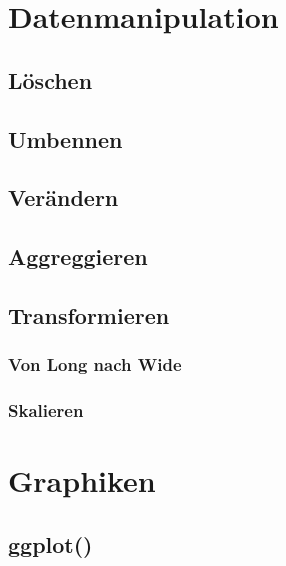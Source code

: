 \documentclass[
]{book}
\begin{document}
\hypertarget{datenmanipulation}{%
\chapter{Datenmanipulation}\label{datenmanipulation}}

\hypertarget{luxf6schen}{%
\section{Löschen}\label{luxf6schen}}

\hypertarget{umbennen}{%
\section{Umbennen}\label{umbennen}}

\hypertarget{veruxe4ndern}{%
\section{Verändern}\label{veruxe4ndern}}

\hypertarget{aggreggieren}{%
\section{Aggreggieren}\label{aggreggieren}}

\hypertarget{transformieren}{%
\section{Transformieren}\label{transformieren}}

\hypertarget{von-long-nach-wide}{%
\subsection{Von Long nach Wide}\label{von-long-nach-wide}}

\hypertarget{skalieren}{%
\subsection{Skalieren}\label{skalieren}}

\hypertarget{graphiken}{%
\chapter{Graphiken}\label{graphiken}}

\hypertarget{ggplot}{%
\section{ggplot()}\label{ggplot}}
\end{document}
